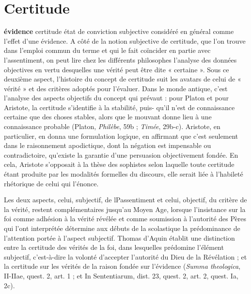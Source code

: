 
\section{Certitude}
%
{\bf évidence}
certitude état de conviction subjective
considéré en général comme l'effet d’une
évidence. A côté de la notion subjective de
certitude, que l’on trouve dans l’emploi
commun du terme et qui le fait coïncider
en partie avec l’assentiment, on peut lire
chez les différents philosophes l’analyse
des données objectives en vertu desquelles
une vérité peut être dite « certaine ». Sous
ce deuxième aspect, l’histoire du concept
de certitude suit les avatars de celui de
« vérité » et des critères adoptés pour
l’évaluer. Dans le monde antique, c’est
l'analyse des aspects objectifs du concept
qui prévaut : pour Platon et pour Aristote,
la certitude s’identifie à la stabilité, puis-
qu’il n’est de connaissance certaine que
des choses stables, alors que le mouvant
donne lieu à une connaissance probable
(Platon, {\it Philèbe}, 59b ; {\it Timée}, 29b-c).
Aristote, en particulier, en donna une
formulation logique, en affirmant que c’est
%
seulement dans le raisonnement apodictique,
dont la négation est impensable ou
contradictoire, qu’existe la garantie d’une
persuasion objectivement fondée. En cela,
Aristote s’opposait à la thèse des sophistes
selon laquelle toute certitude étant produite
par les modalités formelles du discours,
elle serait liée à l’habileté rhétorique
de celui qui l’énonce.

Les deux aspects, celui, subjectif, de
lPassentiment et celui, objectif, du critère
de la vérité, restent complémentaires jusqu’au
Moyen Age, lorsque l’insistance sur
la foi comme adhésion à la vérité révélée
et comme soumission à l'autorité des
Pères qui l’ont interprétée détermine aux
débuts de la scolastique la prédominance
de l'attention portée à l’aspect subjectif.
Thomas d'Aquin établit une distinction
entre la certitude des vérités de la foi,
dans lesquelles prédomine l’élément subjectif,
c’est-à-dire la volonté d’accepter
l’autorité du Dieu de la Révélation ; et la
certitude sur les vérités de la raison fondée
sur l’évidence ({\it Summa theologica}, 
II-IIae, quest. 2, art. 1 ; et {\it }In Sententiarum,
dist. 23, quest. 2, art. 2, quest. Ia, 2c).

